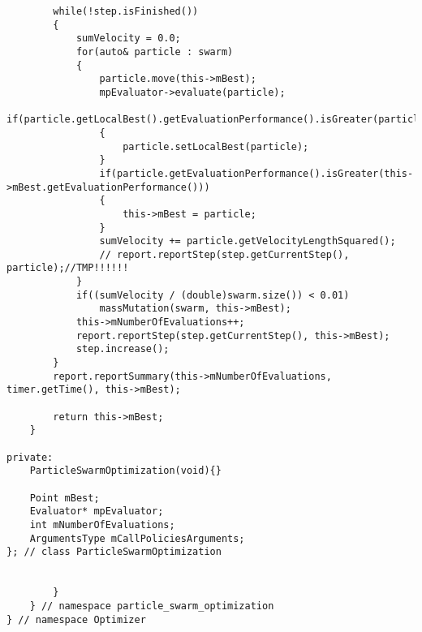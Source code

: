 \begin{lstlisting}
        while(!step.isFinished())
        {
            sumVelocity = 0.0;
            for(auto& particle : swarm)
            {
                particle.move(this->mBest);
                mpEvaluator->evaluate(particle);
                if(particle.getLocalBest().getEvaluationPerformance().isGreater(particle.getEvaluationPerformance()))
                {
                    particle.setLocalBest(particle);
                }
                if(particle.getEvaluationPerformance().isGreater(this->mBest.getEvaluationPerformance()))
                {
                    this->mBest = particle;
                }
                sumVelocity += particle.getVelocityLengthSquared();
                // report.reportStep(step.getCurrentStep(), particle);//TMP!!!!!!
            }
            if((sumVelocity / (double)swarm.size()) < 0.01)
                massMutation(swarm, this->mBest);
            this->mNumberOfEvaluations++;
            report.reportStep(step.getCurrentStep(), this->mBest);
            step.increase();
        }
        report.reportSummary(this->mNumberOfEvaluations, timer.getTime(), this->mBest);

        return this->mBest;
    }

private:
    ParticleSwarmOptimization(void){}

    Point mBest;
    Evaluator* mpEvaluator;
    int mNumberOfEvaluations;
    ArgumentsType mCallPoliciesArguments;
}; // class ParticleSwarmOptimization


        }
    } // namespace particle_swarm_optimization
} // namespace Optimizer
\end{lstlisting}



